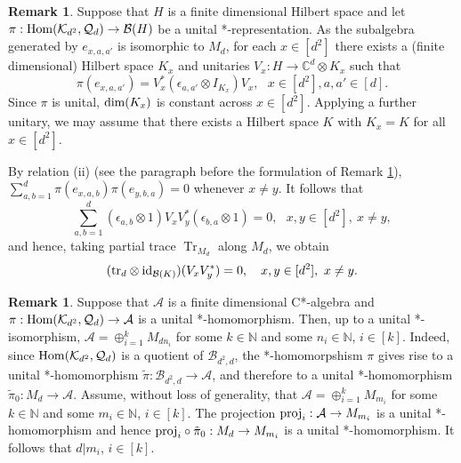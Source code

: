 \documentclass[11pt]{amsart}
\theoremstyle{definition}
\newtheorem{remark}[theorem]{Remark}
\newcommand{\cl}[1]{\mathcal{#1}}
\newcommand{\bb}[1]{\mathbb{#1}}
\DeclareMathOperator{\Tr}{Tr}
\begin{document}
\begin{remark}\label{r_unipa}
\rm 
Suppose that $H$ is a finite dimensional Hilbert space and let 
$\pi : {\rm Hom}(\cl K_{d^2}, \cl Q_d)\to \cl B(H)$ be a 
unital *-representation.  
As the subalgebra generated by $e_{x,a,a'}$ is isomorphic to $M_d$, 
for each $x\in[d^2]$ there exists a (finite dimensional)
Hilbert space $K_x$ and unitaries 
$V_x : H\to  \mathbb C^d\otimes K_x$ such that 
$$\pi(e_{x,a,a'}) = V_x^*(\epsilon_{a,a'}\otimes I_{K_x})V_x,
\ \ \ x\in [d^2], a,a'\in [d].$$
Since $\pi$ is unital, ${\rm dim}(K_x)$ is constant across $x\in [d^2]$. 
Applying a further unitary, we may assume that 
there exists a Hilbert space $K$ with $K_x = K$ for all $x\in [d^2]$. 

By relation (ii) (see the paragraph before the formulation 
of Remark \ref{r_unipa}), 
$\sum_{a,b=1}^d \pi(e_{x,a,b})\pi(e_{y,b,a})=0$ whenever $x\ne y$.
It follows that 
$$\sum_{a,b=1}^d (\epsilon_{a,b}\otimes 1)V_xV_y^*(\epsilon_{b,a}\otimes 1) = 0, \ \ \ x,y\in [d^2], \ x\neq y,$$
and hence, taking partial trace $\Tr_{M_d}$ along $M_d$, we obtain
\begin{equation}\label{trace}
({\rm tr}_d\otimes{\rm id}_{\cl B(K)})(V_xV_y^*) = 0, \ \ \ 
x,y\in [d^2], \ x\neq y.
\end{equation}
\end{remark}


\begin{remark}\label{r_krantnd}
\rm 
Suppose that $\cl A$ is a finite dimensional C*-algebra
and $\pi : {\rm Hom}(\cl K_{d^2}, \cl Q_d)\to \cl A$ is a 
unital *-homomorphism. Then, up to a unital *-isomorphism, 
$\cl A = \oplus_{i=1}^k M_{d n_i}$ for some $k\in \bb{N}$
and some $n_i\in \bb{N}$, $i\in [k]$.
Indeed, since ${\rm Hom}(\cl K_{d^2}, \cl Q_d)$ is a quotient
of $\cl B_{d^2,d}$, the *-homomorpshism $\pi$ gives rise to a 
unital *-homomorphism $\tilde{\pi} : \cl B_{d^2,d}\to \cl A$, 
and therefore to a unital *-homomorphism $\tilde{\pi}_0 : M_d\to \cl A$.
Assume, without loss of generality, that 
$\cl A = \oplus_{i=1}^k M_{m_i}$ for some $k\in \bb{N}$
and some $m_i\in \bb{N}$, $i\in [k]$.
The projection ${\rm proj}_i : \cl A \to M_{m_i}$ is a unital 
*-homomorphism and hence ${\rm proj}_i \circ \tilde{\pi}_0 : 
M_d\to M_{m_i}$ is a unital *-homomorphism. 
It follows that $d | m_i$, $i\in [k]$.
\end{remark}
\end{document}
